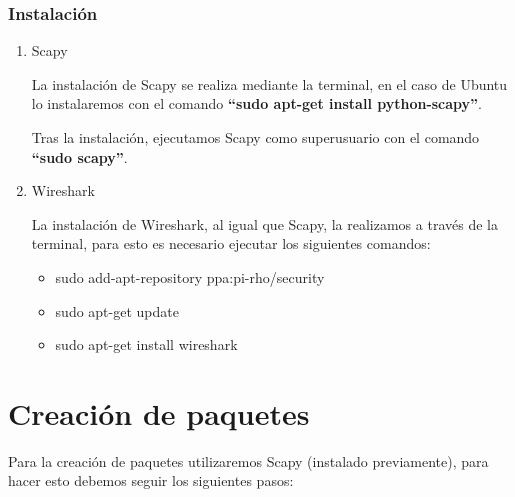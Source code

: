 \documentclass[spanish]{udpreport}
\begin{document}
\subsection{Instalación}
\begin{enumerate}
	\item Scapy
    	\par La instalación de Scapy se realiza mediante la terminal, en el caso de Ubuntu lo instalaremos con el comando \textbf{“sudo apt-get install python-scapy”}.
        \par Tras la instalación, ejecutamos Scapy como superusuario con el comando \textbf{“sudo scapy”}.
    \item Wireshark
    	\par La instalación de Wireshark, al igual que Scapy, la realizamos a través de la terminal, para esto es necesario ejecutar los siguientes comandos:
        \begin{itemize}
			\item sudo add-apt-repository ppa:pi-rho/security
            \item sudo apt-get update
			\item sudo apt-get install wireshark
		\end{itemize}
\end{enumerate}

\chapter{Creación de paquetes}

\par Para la creación de paquetes utilizaremos Scapy (instalado previamente), para hacer esto debemos seguir los siguientes pasos:
\end{document}
